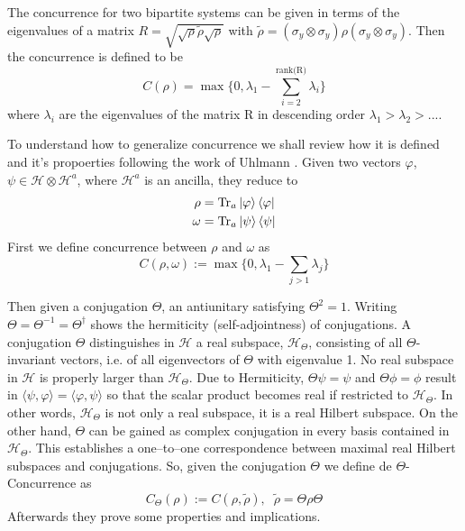 The concurrence for two bipartite systems can be given in terms of the eigenvalues of a matrix $R=\sqrt{\sqrt{\rho}\tilde\rho\sqrt{\rho}}$ with $\tilde\rho=(\sigma_y\otimes\sigma_y) \rho (\sigma_y\otimes\sigma_y)$. Then the concurrence is defined to be
\begin{equation}
    C(\rho)=\max\{0,\lambda_1-\sum_{i=2}^{\text{rank(R)}}\lambda_i\}
\end{equation}
where $\lambda_i$ are the eigenvalues of the matrix R in descending order $\lambda_1>\lambda_2>...$. 

To understand how to generalize concurrence we shall review how it is defined and it's propoerties following the work of Uhlmann \cite{http://arxiv.org/abs/quant-ph/9909060v4}. Given two vectors $\varphi$, $\psi \in \mathcal{H}\otimes\mathcal{H}^a$, where $\mathcal{H}^a$ is an ancilla, they reduce to 
\begin{align*}
    \rho&=\text{Tr}_a\ket{\varphi}\bra{\varphi} \\
    \omega & = \text{Tr}_a\ket{\psi}\bra{\psi}  
\end{align*}
First we define concurrence between $\rho$ and $\omega$ as
\begin{equation}
    C(\rho,\omega):= \max \{0,\lambda_1-\sum_{j>1}\lambda_j\}
\end{equation}

Then given a conjugation $\Theta$, an
 antiunitary satisfying $\Theta^2 = 1$. Writing $\Theta = \Theta^{-1} = \Theta^\dagger$ shows the hermiticity (self-adjointness) of conjugations. A conjugation $\Theta$ distinguishes in $\mathcal{H}$ a real subspace, $\mathcal{H}_\Theta$,
 consisting of all $\Theta$-invariant vectors, i.e. of all eigenvectors of $\Theta$ with eigenvalue 1. No real subspace in $\mathcal{H}$ is
 properly larger than $\mathcal{H}_\Theta$. Due to Hermiticity, $\Theta \psi = \psi$
 and $\Theta\phi = \phi$ result in
 $\langle\psi,\varphi\rangle=\langle\varphi,\psi\rangle$
 so that the scalar product becomes real if restricted to $\mathcal{H}_\Theta$. In other words, $\mathcal{H}_\Theta$ is not only a real subspace, it is a real Hilbert subspace. On the other hand, $\Theta$ can be gained as complex conjugation in every basis contained
 in $\mathcal{H}_\Theta$. This establishes a one–to–one correspondence between maximal real Hilbert subspaces and conjugations. So, given the conjugation $\Theta$ we define de $\Theta$-Concurrence as 
 \begin{equation}
     C_\Theta(\rho):=C(\rho,\tilde\rho), \; \; \tilde\rho=\Theta\rho\Theta
 \end{equation}
Afterwards they prove some properties and implications.

